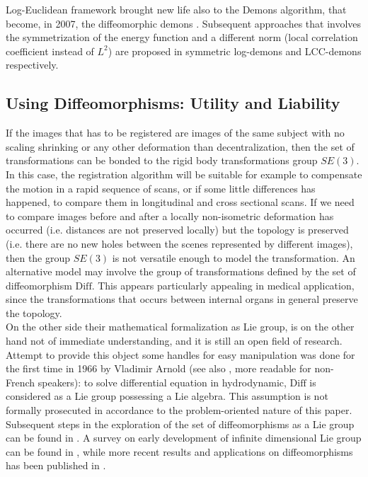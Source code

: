 \begin{enumerate}
	Log-Euclidean framework brought new life also to the Demons algorithm, that  become, in 2007, the diffeomorphic demons \cite{vercauteren2007non}.
	Subsequent approaches that involves the symmetrization of the energy function and a different norm (local correlation coefficient instead of $L^{2}$) are proposed in symmetric log-demons \cite{vercauteren08} and LCC-demons \cite{lorenzi2013lcc} respectively.
	
\end{enumerate}


\subsection{Using Diffeomorphisms: Utility and Liability}\label{se:diffe_util_and_liab}

If the images that has to be registered are images of the same subject with no scaling shrinking or any other deformation than decentralization, then the set of transformations can be bonded to the rigid body transformations group $SE(3)$. In this case, the registration algorithm will be suitable for example to compensate the motion in a rapid sequence of scans, or if some little differences has happened, to compare them in longitudinal and cross sectional scans. If we need to compare images before and after a locally non-isometric deformation has occurred (i.e. distances are not preserved locally) but the topology is preserved (i.e. there are no new holes between the scenes represented by different images), then the group $SE(3)$ is not versatile enough to model the transformation. An alternative model may involve the group of transformations defined by the set of diffeomorphism $\text{Diff}$. This appears particularly appealing in medical application, since the transformations that occurs between internal organs in general preserve the topology.\\
On the other side their mathematical formalization as Lie group, is on the other hand not of immediate understanding, and it is still an open field of research.\\ 
Attempt to provide this object some handles for easy manipulation was done for the first time in 1966 by Vladimir Arnold \cite{arnold1966geometrie} (see also \cite{arnold1998topological}, more readable for non-French speakers): to solve differential equation in hydrodynamic, $\text{Diff}$ is considered as a Lie group possessing a Lie algebra. This assumption is not formally prosecuted in accordance to the problem-oriented nature of this paper. Subsequent steps in the exploration of the set of diffeomorphisms as a Lie group can be found in \cite{marsden1970hamiltonian, ebin1970groups, omori1970group, leslie1983lie}. A survey on early development of infinite dimensional Lie group can be found in \cite{Milnor:84:remarks}, while more recent results and applications on diffeomorphisms has been published in \cite{ovsienko1992integrals, bauer2010sobolev,schmid2010infinite,  bauer2011geodesic}.\\

